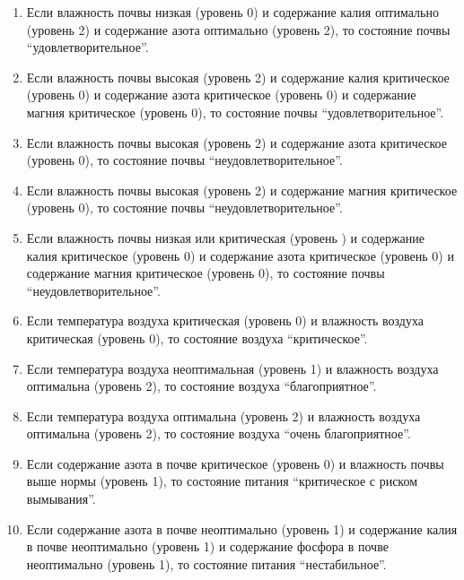 \begin{enumerate}
    \item Если влажность почвы низкая (уровень 0) и содержание калия оптимально (уровень 2) и содержание азота оптимально (уровень 2), то состояние почвы \enquote{удовлетворительное}.

    \item Если влажность почвы высокая (уровень 2) и содержание калия критическое (уровень 0) и содержание азота критическое (уровень 0) и содержание магния критическое (уровень 0), то состояние почвы \enquote{удовлетворительное}.

    \item Если влажность почвы высокая (уровень 2) и содержание азота критическое (уровень 0), то состояние почвы \enquote{неудовлетворительное}.

    \item Если влажность почвы высокая (уровень 2) и содержание магния критическое (уровень 0), то состояние почвы \enquote{неудовлетворительное}.

    \item Если влажность почвы низкая или критическая (уровень ) и содержание калия критическое (уровень 0) и содержание азота критическое (уровень 0) и содержание магния критическое (уровень 0), то состояние почвы \enquote{неудовлетворительное}.

    \item Если температура воздуха критическая (уровень 0) и влажность воздуха критическая (уровень 0), то состояние воздуха \enquote{критическое}.

    \item Если температура воздуха неоптимальная (уровень 1) и влажность воздуха оптимальна (уровень 2), то состояние воздуха \enquote{благоприятное}.

    \item Если температура воздуха оптимальна (уровень 2) и влажность воздуха оптимальна (уровень 2), то состояние воздуха \enquote{очень благоприятное}.

    \item Если содержание азота в почве критическое (уровень 0) и влажность почвы выше нормы (уровень 1), то состояние питания \enquote{критическое с риском вымывания}.

    \item Если содержание азота в почве неоптимально (уровень 1) и содержание калия в почве неоптимально (уровень 1) и содержание фосфора в почве неоптимально (уровень 1), то состояние питания \enquote{нестабильное}.


\end{enumerate}
